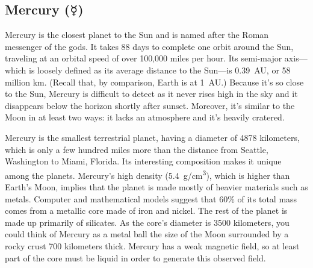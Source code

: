 \documentclass{article}
\numberwithin{equation}{section}
\numberwithin{figure}{section}
\begin{document}
\subsection{Mercury ($\Mercury$)} \label{IF2QAz}

Mercury is the closest planet to the Sun and is named after the Roman messenger of the gods. It takes 88 days to complete one orbit around the Sun, traveling at an orbital speed of over 100,000 miles per hour. Its semi-major axis---which is loosely defined as its average distance to the Sun---is \SI{0.39}{AU}, or 58 million km. (Recall that, by comparison, Earth is at \SI{1}{AU}.) Because it's so close to the Sun, Mercury is difficult to detect as it never rises high in the sky and it disappears below the horizon shortly after sunset. Moreover, it's similar to the Moon in at least two ways: it lacks an atmosphere and it's heavily cratered. 

\vspace{1em}

Mercury is the smallest terrestrial planet, having a diameter of 4878 kilometers, which is only a few hundred miles more than the distance from Seattle, Washington to Miami, Florida. Its interesting composition makes it unique among the planets. Mercury's high density (\SI{5.4}{g/cm^3}), which is higher than Earth's Moon, implies that the planet is made mostly of heavier materials such as metals. Computer and mathematical models suggest that 60\% of its total mass comes from a metallic core made of iron and nickel. The rest of the planet is made up primarily of silicates. As the core's diameter is 3500 kilometers, you could think of Mercury as a metal ball the size of the Moon surrounded by a rocky crust 700 kilometers thick. Mercury has a weak magnetic field, so at least part of the core must be liquid in order to generate this observed field.

\vspace{1em} 
\end{document}
